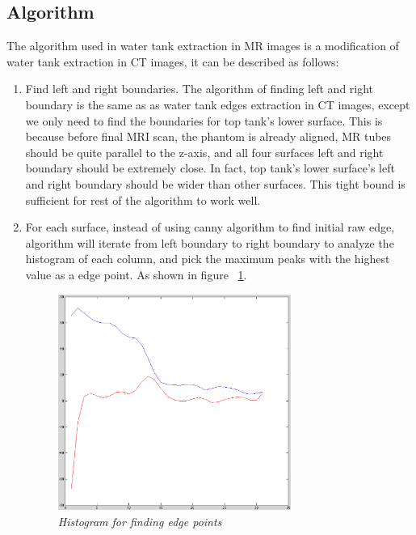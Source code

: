 \subsection{Algorithm}

The algorithm used in water tank extraction in MR images is a modification of water tank extraction in CT
images, it can be described as follows:

\begin{enumerate}
  \item Find left and right boundaries. The algorithm of finding left and right boundary is the same as 
    as water tank edges extraction in CT images, except we only need to find the boundaries for top tank's
    lower surface. This is because before final MRI scan, the phantom is already aligned, MR tubes should 
    be quite parallel to the z-axis, and all four surfaces left and right boundary should be extremely close.
    In fact, top tank's lower surface's left and right boundary should be wider than other surfaces. This tight
    bound is sufficient for rest of the algorithm to work well.
  \item For each surface, instead of using canny algorithm to find initial raw edge, algorithm will iterate 
    from left boundary to right boundary to analyze the histogram of each column, and pick the maximum peaks
    with the highest value as a edge point. As shown in figure ~\ref{fig:mri_edge_point_histograms}.
    \begin{figure}[htb]
      \hfill
      \begin{minipage}[b]{3in}
        \centering
        \centerline{\mbox{\includegraphics[width=3in]{data_extraction/images/MRI/find_edge_point.eps}}}
      \end{minipage}
      \hfill
      \caption{\emph{Histogram for finding edge points}}
      \label{fig:mri_edge_point_histograms}
    \end{figure}

\end{enumerate}
